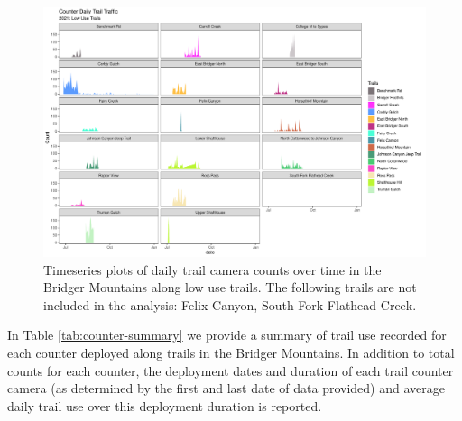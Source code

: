 \documentclass[
]{book}
\begin{document}
\begin{figure}

{\centering \includegraphics[width=1\linewidth]{../figures/Counter_bySubsection_TS_lowuse} 

}

\caption{Timeseries plots of daily trail camera counts over time in the Bridger Mountains along low use trails. The following trails are not included in the analysis: Felix Canyon, South Fork Flathead Creek.}\label{fig:counter-byid-low}
\end{figure}

In Table \ref{tab:counter-summary} we provide a summary of trail use
recorded for each counter deployed along trails in the Bridger
Mountains. In addition to total counts for each counter, the deployment
dates and duration of each trail counter camera (as determined by the
first and last date of data provided) and average daily trail use over
this deployment duration is reported.
\end{document}
